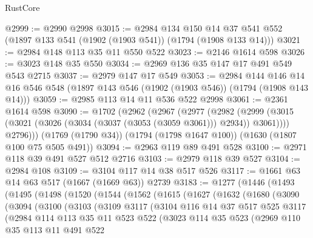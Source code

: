 \begin{lexlean}{RustCore}
\begin{coremodule}
@2999 := @2990 @2998
@3015 := @2984
    @134
    @150
    @14
    @37
    @541
    @552
    (@1897 @133 @541 (@1902 (@1903 @541)) (@1794 (@1908 @133 @14)))
@3021 := @2984 @148 @113 @35 @11 @550 @522
@3023 := @2146 @1614 @598
@3026 := @3023 @148 @35 @550
@3034 := @2969 @136 @35 @147 @17 @491 @549 @543 @2715
@3037 := @2979 @147 @17 @549
@3053 := @2984
    @144
    @146
    @14
    @16
    @546
    @548
    (@1897 @143 @546 (@1902 (@1903 @546)) (@1794 (@1908 @143 @14)))
@3059 := @2985 @113 @14 @11 @536 @522 @2998
@3061 := @2361 @1614 @598
@3090 := @1702
    (@2962
      (@2967
        (@2977
          (@2982 (@2999 (@3015 (@3021 (@3026 (@3034 (@3037 (@3053 (@3059 @3061))) @2934)) @3061))))
          @2796)))
    (@1769 (@1790 @34))
    (@1794 (@1798 @1647 @100))
    (@1630 (@1807 @100 @75 @505 @491))
@3094 := @2963 @119 @89 @491 @528
@3100 := @2971 @118 @39 @491 @527 @512 @2716
@3103 := @2979 @118 @39 @527
@3104 := @2984 @108
@3109 := @3104 @117 @14 @38 @517 @526
@3117 := @1661 @63 @14 @63 @517 (@1667 (@1669 @63)) @2739
@3183 := @1277
    (@1446
      (@1493
        (@1495
          (@1498
            (@1520
              (@1544
                (@1562
                  (@1615
                    (@1627
                      (@1632
                        (@1680
                          (@3090
                            (@3094
                              (@3100
                                (@3103
                                  (@3109
                                    @3117
                                    (@3104
                                      @116
                                      @14
                                      @37
                                      @517
                                      @525
                                      @3117
                                      (@2984
                                        @114
                                        @113
                                        @35
                                        @11
                                        @523
                                        @522
                                        (@3023
                                          @114
                                          @35
                                          @523
                                          (@2969
                                            @110
                                            @35
                                            @113
                                            @11
                                            @491
                                            @522

\end{coremodule}
\end{lexlean}
